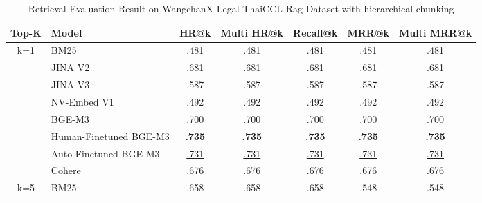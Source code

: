 \begin{table}[!h]
\centering
\caption{Retrieval Evaluation Result on WangchanX Legal ThaiCCL Rag Dataset with hierarchical chunking}
\renewcommand{\arraystretch}{1.5} %
\label{table: retrieval_wangchan}
\begin{tabular}{@{}clccccc@{}}
\toprule
Top-K & Model                  & \multicolumn{1}{c}{HR@k} & \multicolumn{1}{c}{Multi HR@k} & \multicolumn{1}{c}{Recall@k} & \multicolumn{1}{c}{MRR@k} & \multicolumn{1}{c}{Multi MRR@k} \\ \midrule
k=1   & BM25                   & .481                     & .481                           & .481                         & .481                      & .481                            \\
      & JINA V2                & .681                     & .681                           & .681                         & .681                      & .681                            \\
      & JINA V3                & .587                     & .587                           & .587                         & .587                      & .587                            \\
      & NV-Embed V1            & .492                     & .492                           & .492                         & .492                      & .492                            \\
      & BGE-M3                 & .700                     & .700                           & .700                         & .700                      & .700                            \\
      & Human-Finetuned BGE-M3 & \textbf{.735}            & \textbf{.735}                  & \textbf{.735}                & \textbf{.735}             & \textbf{.735}                   \\
      & Auto-Finetuned BGE-M3  & \underline{.731}               & \underline{.731}                     & \underline{.731}                   & \underline{.731}                & \underline{.731}                      \\
      & Cohere                 & .676                     & .676                           & .676                         & .676                      & .676                            \\ \midrule
k=5   & BM25                   & .658                     & .658                           & .658                         & .548                      & .548                            \\

\end{tabular}
\end{table}
